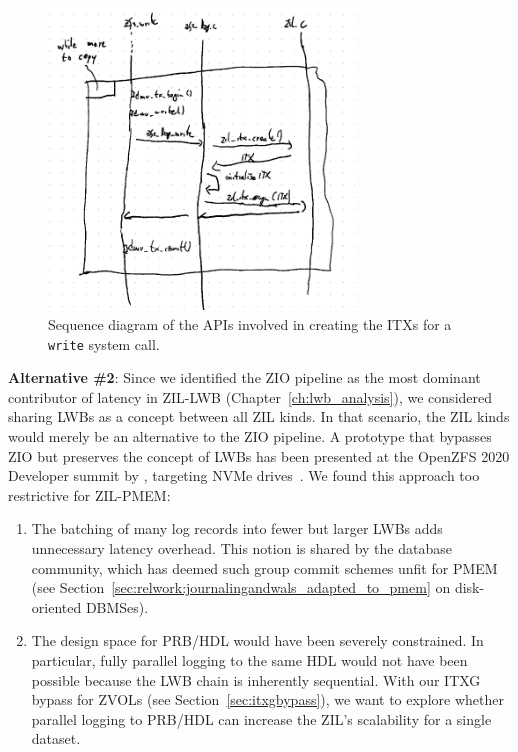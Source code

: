 \documentclass[12pt,a4paper,twoside]{book}
\begin{document}
{\begin{figure}[H]
    \centering
    \includegraphics[height=8cm]{fig/zfs_log_write_sequence_diagram}
    \caption{Sequence diagram of the APIs involved in creating the ITXs for a \lstinline{write} system call.}
    \label{fig:zfs_log_write_sequence_diagram}
\end{figure}

\textbf{Alternative \#2}: Since we identified the ZIO pipeline as the most dominant contributor of latency in ZIL-LWB (Chapter~\ref{ch:lwb_analysis}), we considered sharing LWBs as a concept between all ZIL kinds.
In that scenario, the ZIL kinds would merely be an alternative to the ZIO pipeline.
A prototype that bypasses ZIO but preserves the concept of LWBs has been presented at the OpenZFS 2020 Developer summit by \citeauthor{openzfsZILPerformanceImprovements2020}, targeting NVMe drives~\cite{openzfsZILPerformanceImprovements2020}.
We found this approach too restrictive for ZIL-PMEM:
\begin{enumerate}[noitemsep]
    \item The batching of many log records into fewer but larger LWBs adds unnecessary latency overhead.
        This notion is shared by the database community, which has deemed such group commit schemes unfit for PMEM (see Section~\ref{sec:relwork:journalingandwals_adapted_to_pmem} on disk-oriented DBMSes).
    \item The design space for PRB/HDL would have been severely constrained.
        In particular, fully parallel logging to the same HDL would not have been possible because the LWB chain is inherently sequential.
        With our ITXG bypass for ZVOLs (see Section~\ref{sec:itxgbypass}), we want to explore whether parallel logging to PRB/HDL can increase the ZIL's scalability for a single dataset.
\end{enumerate}

}
\end{document}
